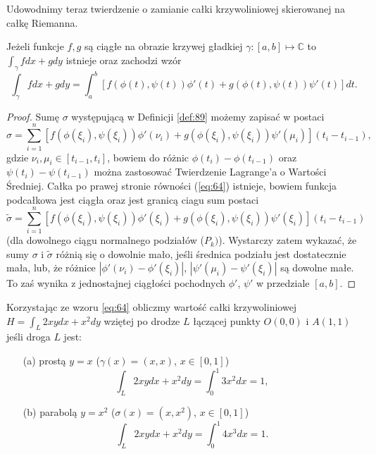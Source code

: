 \documentclass[leqno]{article}
\begin{document}
\begin{justify}
Udowodnimy teraz twierdzenie o zamianie całki krzywoliniowej skierowanej na całkę Riemanna.

\begin{theorem}
{
    Jeżeli funkcje $f, g$ są ciągłe na obrazie krzywej gładkiej $\gamma : [a,b] \mapsto \mathbb{C}$ to $\int_{\gamma}fdx + gdy$ istnieje oraz zachodzi wzór
    \begin{equation}\label{eq:64}
        \int_{\gamma}fdx + gdy = \int_{a}^{b}[f(\phi(t), \psi(t))\phi'(t) + g(\phi(t), \psi(t))\psi'(t)]dt.
    \end{equation}
}
\end{theorem}

\begin{proof}
    Sumę $\sigma$ występującą w Definicji \ref{def:89} możemy zapisać w postaci
    \[
        \sigma = \sum_{i=1}^{n}[f(\phi(\xi_i), \psi(\xi_i))\phi'(\nu_i) + g(\phi(\xi_i), \psi(\xi_i))\psi'(\mu_i)](t_i - t_{i-1}),
    \]
    gdzie $\nu_i, \mu_i \in [t_{i-1}, t_i]$, bowiem do różnic $\phi(t_i) - \phi(t_{i-1})$ oraz  $\psi(t_i) - \psi(t_{i-1})$ można zastosować Twierdzenie Lagrange'a o Wartości Średniej. Całka po prawej stronie równości (\ref{eq:64}) istnieje, bowiem funkcja podcałkowa jest ciągła oraz jest granicą ciagu sum postaci
    \[
        \tilde{\sigma} = \sum_{i=1}^{n}[f(\phi(\xi_i), \psi(\xi_i))\phi'(\xi_i) + g(\phi(\xi_i), \psi(\xi_i))\psi'(\xi_i)](t_i - t_{i-1})
    \]
    (dla dowolnego ciągu normalnego podziałów ($P_k)$). Wystarczy zatem wykazać, że sumy $\sigma$ i $\tilde{\sigma}$ różnią się o dowolnie mało, jeśli średnica podziału jest dostatecznie mała, lub, że różnice $|\phi'(\nu_i) - \phi'(\xi_i)|$, $|\psi'(\mu_i) - \psi'(\xi_i)|$ są dowolne małe. To zaś wynika z jednostajnej ciągłości pochodnych $\phi'$, $\psi'$ w przedziale $[a,b]$. 
\end{proof}

\begin{ex}
    Korzystając ze wzoru \ref{eq:64} obliczmy wartość całki krzywoliniowej $H = \int_{L}2xydx + x^2dy$ wziętej po drodze $L$ łączącej punkty $O(0,0)$ i $A(1,1)$ jeśli droga $L$ jest: 
    \begin{itemize}
        \item [(a)]
            prostą $y = x$ ($\gamma(x) = (x,x)$, $x \in [0,1]$)
            \[
                \int_{L}2xydx + x^2dy = \int_{0}^{1}3x^2dx = 1,
            \]
        \item [(b)]
            parabolą $y = x^2$ ($\sigma(x)=(x, x^2)$, $x \in [0,1]$)
            \[
                \int_{L}2xydx + x^2dy = \int_{0}^{1}4x^3dx = 1.
            \]
    \end{itemize}
\end{ex}


\end{justify}
\end{document}

